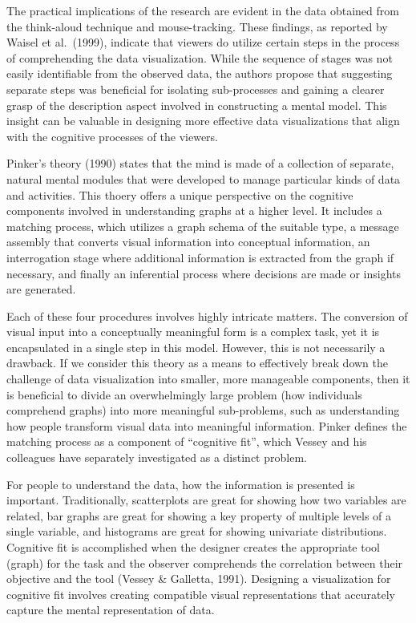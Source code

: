 \documentclass[print]{nuthesis}
\begin{document}
The practical implications of the research are evident in the data obtained from the think-aloud technique and mouse-tracking.
These findings, as reported by Waisel et al.~(1999), indicate that viewers do utilize certain steps in the process of comprehending the data visualization.
While the sequence of stages was not easily identifiable from the observed data, the authors propose that suggesting separate steps was beneficial for isolating sub-processes and gaining a clearer grasp of the description aspect involved in constructing a mental model.
This insight can be valuable in designing more effective data visualizations that align with the cognitive processes of the viewers.

Pinker's theory (1990) states that the mind is made of a collection of separate, natural mental modules that were developed to manage particular kinds of data and activities.
This thoery offers a unique perspective on the cognitive components involved in understanding graphs at a higher level.
It includes a matching process, which utilizes a graph schema of the suitable type, a message assembly that converts visual information into conceptual information, an interrogation stage where additional information is extracted from the graph if necessary, and finally an inferential process where decisions are made or insights are generated.

Each of these four procedures involves highly intricate matters.
The conversion of visual input into a conceptually meaningful form is a complex task, yet it is encapsulated in a single step in this model.
However, this is not necessarily a drawback.
If we consider this theory as a means to effectively break down the challenge of data visualization into smaller, more manageable components, then it is beneficial to divide an overwhelmingly large problem (how individuals comprehend graphs) into more meaningful sub-problems, such as understanding how people transform visual data into meaningful information.
Pinker defines the matching process as a component of ``cognitive fit'', which Vessey and his colleagues have separately investigated as a distinct problem.

For people to understand the data, how the information is presented is important.
Traditionally, scatterplots are great for showing how two variables are related, bar graphs are great for showing a key property of multiple levels of a single variable, and histograms are great for showing univariate distributions.
Cognitive fit is accomplished when the designer creates the appropriate tool (graph) for the task and the observer comprehends the correlation between their objective and the tool (Vessey \& Galletta, 1991).
Designing a visualization for cognitive fit involves creating compatible visual representations that accurately capture the mental representation of data.
\end{document}
